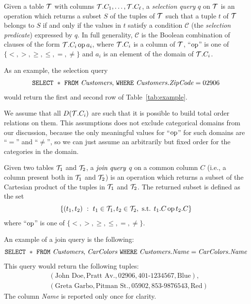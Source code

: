 \begin{definition}\label{def:selectquery}
  Given a table ${\cal T}$ with columns ${\cal T}.C_1,\dotsc,{\cal T}.C_\ell$, a
  \emph{selection query} $q$ on ${\cal T}$ is an operation which returns a subset
  $S$ of the tuples of ${\cal T}$ such that a tuple $t$ of ${\cal T}$ belongs to $S$ if
  and only if the values in $t$ satisfy a condition $\mathcal{C}$
  (the \emph{selection predicate}) expressed by $q$. In full
  generality, $\mathcal{C}$ is the Boolean combination of clauses of the form
  ${\cal T}.C_i \operatorname{op} a_i$, where ${\cal T}.C_i$ is a column of ${\cal T}$, ``$\operatorname{op}$'' is one
  of $\{<,>,\ge,\le,=,\neq\}$ and $a_i$ is an element of the domain of
  ${\cal T}.C_i$.
\end{definition}

As an example, the selection query 
\[
\mbox{\texttt{SELECT} } * \mbox{ \texttt{FROM} \emph{Customers},  \texttt{WHERE}
\emph{Customers.ZipCode}} = 02906
\]
would return the first and second row of Table~\ref{tab:example}.

We assume that all $D({\cal T}.C_i)$ are such that it is possible to build total
order relations on them. This assumptions does not exclude categorical domains
from our discussion, because the only meaningful values for ``$\operatorname{op}$'' for such
domains are ``$=$'' and ``$\neq$'', so we can just assume an arbitrarily but fixed
order for the categories in the domain.

\begin{definition}\label{def:joinquery}
  Given two tables ${\cal T}_1$ and ${\cal T}_2$, a $\emph{join query}$ $q$ on a common
  column $C$ (i.e., a column present both in ${\cal T}_1$ and ${\cal T}_2$) is an
  operation which returns a subset of the Cartesian product of the tuples in
  ${\cal T}_1$ and ${\cal T}_2$. The returned subset is defined as the set
  \[
  \{(t_1,t_2) ~:~ t_1\in{\cal T}_1, t_2\in{\cal T}_2, \mbox{ s.t. } t_1.C \operatorname{op} t_2.C \}\]
  where ``$\operatorname{op}$'' is one of $\{<,>,\ge,\le,=,\neq\}$.
\end{definition}

An example of a join query is the following:
\[
\mbox{\texttt{SELECT} } * \mbox{ \texttt{FROM} \emph{Customers}, \emph{CarColors} \texttt{WHERE}
\emph{Customers.Name}} = \mbox{\emph{CarColors.Name}}
\]
This query would return the following tuples:
\begin{align*}
  &(\mbox{John Doe}, \mbox{Pratt Av.}, \mbox{02906}, \mbox{401-1234567}, \mbox{Blue}), \\
  &(\mbox{Greta Garbo}, \mbox{Pitman St.}, \mbox{05902}, \mbox{853-9876543}, \mbox{Red})
\end{align*}
The column \emph{Name} is reported only once for clarity.

